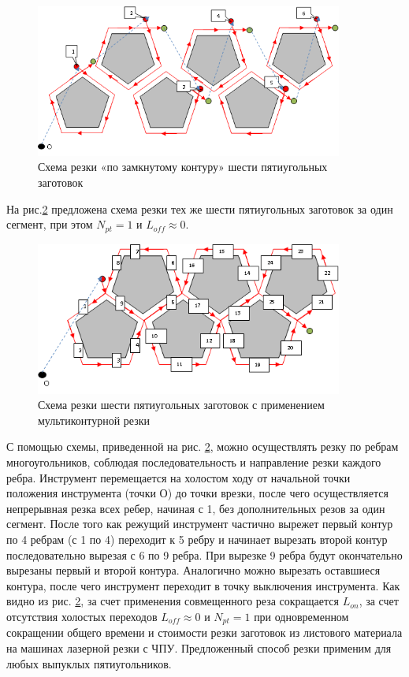 \documentclass[12pt,twoside]{report}
\begin{document}
\begin{figure}
  \begin{center}
  \includegraphics[width=0.9\textwidth]{5-6.png}
  \caption{Схема резки «по замкнутому контуру» шести пятиугольных заготовок}
  \label{5-6}
  \end{center}
\end{figure}

На рис.\ref{5-1}
предложена схема резки тех же шести
пятиугольных заготовок за один сегмент, при этом  $N_{pt}=1$
и $L_{off} \approx 0$.

\begin{figure}
  \begin{center}
  \includegraphics[width=0.9\textwidth]{5-1.png}
  \caption{Схема резки шести пятиугольных заготовок
  с применением мультиконтурной резки}
  \label{5-1}
  \end{center}
\end{figure}

С помощью схемы, приведенной на рис. \ref{5-1},
можно осуществлять резку по ребрам многоугольников,
соблюдая последовательность и направление резки каждого ребра.
Инструмент перемещается на холостом ходу от
начальной точки положения инструмента
(точки О)
до точки врезки, после чего осуществляется непрерывная резка всех ребер,
начиная с 1, без дополнительных резов за один сегмент.
После того как режущий инструмент частично вырежет
первый контур по 4 ребрам (с 1 по 4)
переходит к 5 ребру и начинает вырезать
второй контур последовательно вырезая с 6 по 9 ребра.
При вырезке 9 ребра будут окончательно
вырезаны первый и второй контура.
Аналогично можно вырезать оставшиеся контура,
после чего инструмент переходит в точку выключения инструмента.
Как видно из рис. \ref{5-1},
за счет применения совмещенного реза сокращается $L_{on}$,
за счет отсутствия холостых переходов
$L_{off} \approx 0$
и $N_{pt}=1$
при одновременном сокращении общего времени
и стоимости резки заготовок из листового
материала на машинах лазерной резки с ЧПУ.
Предложенный способ резки применим для любых выпуклых пятиугольников.
\end{document}
